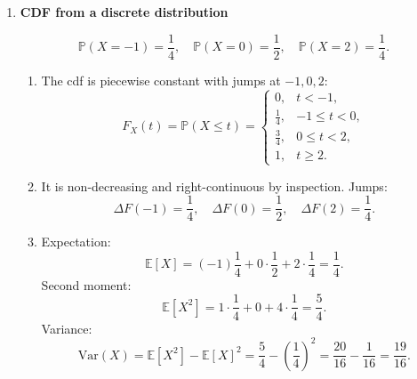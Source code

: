 \documentclass[11pt]{article}
\begin{document}
\begin{enumerate}
Probability of oil slick per drilling: $p=0.1$.

\begin{enumerate}[label=(\alph*)]
\item One drilling $\leadsto$ Bernoulli r.v. $I\in\{0,1\}$ where $I=1$ if slick occurs.
Then $\mathbb{P}(I=1)=p$.

\item For $10$ drillings, $X=\#$ of slicks satisfies $X\sim\mathrm{Bin}(10,0.1)$ if we assume:
\begin{itemize}
\item identical probability $p=0.1$ each time,
\item independence between drillings.
\end{itemize}

\item If $X\sim\mathrm{Bin}(10,0.1)$:
\[
\mathbb{P}(X=2)=\binom{10}{2}(0.1)^2(0.9)^8,
\qquad
\mathbb{P}(X\ge 1)=1-\mathbb{P}(X=0)=1-(0.9)^{10}.
\]
\end{enumerate}

\bigskip

\item \textbf{CDF from a discrete distribution}

\[
\mathbb{P}(X=-1)=\frac14,\quad
\mathbb{P}(X=0)=\frac12,\quad
\mathbb{P}(X=2)=\frac14.
\]

\begin{enumerate}[label=(\alph*)]
\item The cdf is piecewise constant with jumps at $-1,0,2$:
\[
F_X(t)=\mathbb{P}(X\le t)=
\begin{cases}
0, & t<-1,\\[0.2em]
\frac14, & -1\le t<0,\\[0.2em]
\frac34, & 0\le t<2,\\[0.2em]
1, & t\ge 2.
\end{cases}
\]

\item It is non-decreasing and right-continuous by inspection. Jumps:
\[
\Delta F(-1)=\frac14,\quad \Delta F(0)=\frac12,\quad \Delta F(2)=\frac14.
\]

\item Expectation:
\[
\mathbb{E}[X]=(-1)\frac14+0\cdot\frac12+2\cdot\frac14=\frac14.
\]
Second moment:
\[
\mathbb{E}[X^2]=1\cdot\frac14+0+4\cdot\frac14=\frac54.
\]
Variance:
\[
\mathrm{Var}(X)=\mathbb{E}[X^2]-\mathbb{E}[X]^2=\frac54-\left(\frac14\right)^2
=\frac{20}{16}-\frac{1}{16}=\frac{19}{16}.
\]
\end{enumerate}


\end{enumerate}
\end{document}
